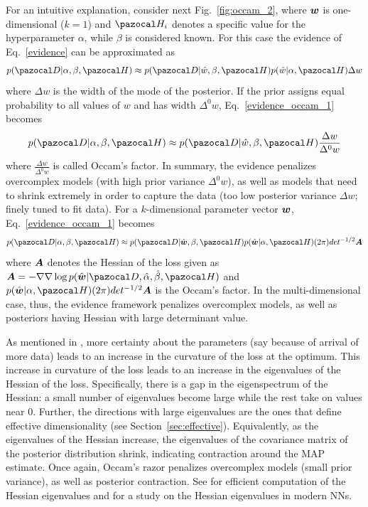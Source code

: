For an intuitive explanation, consider next Fig.~\ref{fig:occam_2}, where $\boldsymbol{w}$ is one-dimensional ($k=1$) and $\cH_i$ denotes a specific value for the hyperparameter $\alpha$, while $\beta$ is considered known. 
For this case the evidence of Eq.~\eqref{evidence} can be approximated as 
\begin{equation}\label{evidence_occam_1}
p(\cD|\alpha, \beta,\cH) \approx p(\cD|\hat{w},\beta,\cH)p(\hat{w}|\alpha,\cH) \Delta w
\end{equation}
where $\Delta w$ is the width of the mode of the posterior. 
If the prior assigns equal probability to all values of $w$ and has width $\Delta^0 w$, Eq.~\eqref{evidence_occam_1} becomes
\begin{equation}\label{evidence_occam_2}
p(\cD|\alpha, \beta,\cH) \approx p(\cD|\hat{w},\beta,\cH) \frac{\Delta w}{\Delta^0 w}
\end{equation}
where $\frac{\Delta w}{\Delta^0 w}$ is called Occam's factor.
In summary, the evidence penalizes overcomplex models (with high prior variance $\Delta^0 w$), as well as models that need to shrink extremely in order to capture the data (too low posterior variance $\Delta w$; finely tuned to fit data). 
For a $k$-dimensional parameter vector $\boldsymbol{w}$, Eq.~\eqref{evidence_occam_1} becomes
\begin{equation}\label{evidence_occam_3}
p(\cD|\alpha, \beta,\cH) \approx p(\cD|\hat{\bw},\beta,\cH)p(\hat{\bw}|\alpha,\cH) (2\pi)det^{-1/2}\bA
\end{equation} 
where $\boldsymbol{A}$ denotes the Hessian of the loss given as $\bA = -\nabla\nabla\log p(\hat{\bw}|\cD,\hat{\alpha},\hat{\beta},\cH) $ and $p(\hat{\bw}|\alpha,\cH) (2\pi)det^{-1/2}\bA$ is the Occam's factor.
In the multi-dimensional case, thus, the evidence framework penalizes overcomplex models, as well as posteriors having Hessian with large determinant value.

As mentioned in \textcite{maddox2020rethinking}, more certainty about the parameters (say because of arrival of more data) leads to an increase in the curvature of the loss at the optimum.
This increase in curvature of the loss leads to an increase in the eigenvalues of the Hessian of the loss. 
Specifically, there is a gap in the eigenspectrum of the Hessian: a small number of eigenvalues become large while the rest take on values near $0$. 
Further, the directions with large eigenvalues are the ones that define effective dimensionality (see Section~\ref{sec:effective}).
Equivalently, as the eigenvalues of the Hessian increase, the eigenvalues of the covariance matrix of the posterior distribution shrink, indicating contraction around the MAP estimate. 
Once again, Occam's razor penalizes overcomplex models (small prior variance), as well as posterior contraction. 
See \textcite{maddox2020rethinking} for efficient computation of the Hessian eigenvalues and \textcite{ghorbani2019investigation} for a study on the Hessian eigenvalues in modern NNs.

